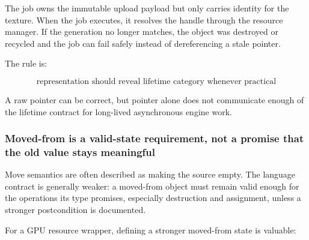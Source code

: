 The job owns the immutable upload payload but only carries identity for the texture. When the job executes, it resolves the handle through the resource manager. If the generation no longer matches, the object was destroyed or recycled and the job can fail safely instead of dereferencing a stale pointer.

The rule is:

\[
\boxed{
\text{representation should reveal lifetime category whenever practical}
}
\]

A raw pointer can be correct, but pointer alone does not communicate enough of the lifetime contract for long-lived asynchronous engine work.

\subsubsection{Moved-from is a valid-state requirement, not a promise that the old value stays meaningful}\label{01-foundations-i-ch005-moved-from-is-a-valid-state-requirement-not-a-promise-that-the-old-value-stays-meaningful}

\hypertarget{01-foundations-i-ch005-moved-from-is-a-valid-state-requirement-not-a-promise-that-the-old-value-stays-meaningful}{}

Move semantics are often described as making the source empty. The language contract is generally weaker: a moved-from object must remain valid enough for the operations its type promises, especially destruction and assignment, unless a stronger postcondition is documented.

For a GPU resource wrapper, defining a stronger moved-from state is valuable:

